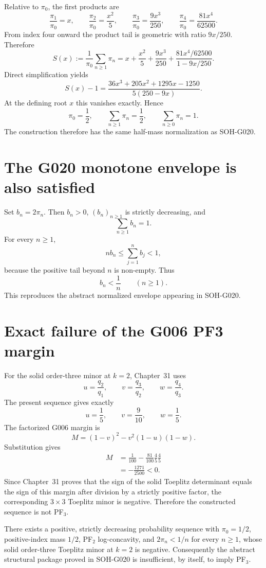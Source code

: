 Relative to $\pi_0$, the first products are
\[
 \frac{\pi_1}{\pi_0}=x,
 \qquad
 \frac{\pi_2}{\pi_0}=\frac{x^2}{5},
 \qquad
 \frac{\pi_3}{\pi_0}=\frac{9x^3}{250},
 \qquad
 \frac{\pi_4}{\pi_0}=\frac{81x^4}{62500}.
\]
From index four onward the product tail is geometric with ratio $9x/250$. Therefore
\[
 S(x):=\frac1{\pi_0}\sum_{n\ge1}\pi_n
 =x+\frac{x^2}{5}+\frac{9x^3}{250}
 +\frac{81x^4/62500}{1-9x/250}.
\]
Direct simplification yields
\[
 S(x)-1
 =\frac{36x^3+205x^2+1295x-1250}{5(250-9x)}.
\]
At the defining root $x$ this vanishes exactly. Hence
\[
 \boxed{\pi_0=\frac12,
 \qquad
 \sum_{n\ge1}\pi_n=\frac12,
 \qquad
 \sum_{n\ge0}\pi_n=1.}
\]
The construction therefore has the same half-mass normalization as SOH-G020.

\section{The G020 monotone envelope is also satisfied}

Set $b_n=2\pi_n$. Then $b_n>0$, $(b_n)_{n\ge1}$ is strictly decreasing, and
\[
 \sum_{n\ge1}b_n=1.
\]
For every $n\ge1$,
\[
 nb_n\le\sum_{j=1}^{n}b_j<1,
\]
because the positive tail beyond $n$ is non-empty. Thus
\[
 \boxed{b_n<\frac1n\qquad(n\ge1).}
\]
This reproduces the abstract normalized envelope appearing in SOH-G020.

\section{Exact failure of the G006 PF3 margin}

For the solid order-three minor at $k=2$, Chapter~31 uses
\[
 u=\frac{q_2}{q_1},
 \qquad
 v=\frac{q_3}{q_2},
 \qquad
 w=\frac{q_4}{q_3}.
\]
The present sequence gives exactly
\[
 \boxed{u=\frac15,
 \qquad
 v=\frac9{10},
 \qquad
 w=\frac15.}
\]
The factorized G006 margin is
\[
 M=(1-v)^2-v^2(1-u)(1-w).
\]
Substitution gives
\[
 \begin{aligned}
 M
 &=\frac1{100}
 -\frac{81}{100}\frac45\frac45\\
 &=\boxed{-\frac{1271}{2500}}<0.
 \end{aligned}
\]
Since Chapter~31 proves that the sign of the solid Toeplitz determinant equals the sign of this margin after division by a strictly positive factor, the corresponding $3\times3$ Toeplitz minor is negative. Therefore the constructed sequence is not PF$_3$.

\begin{theorem}
There exists a positive, strictly decreasing probability sequence with $\pi_0=1/2$, positive-index mass $1/2$, PF$_2$ log-concavity, and $2\pi_n<1/n$ for every $n\ge1$, whose solid order-three Toeplitz minor at $k=2$ is negative. Consequently the abstract structural package proved in SOH-G020 is insufficient, by itself, to imply PF$_3$.
\end{theorem}

